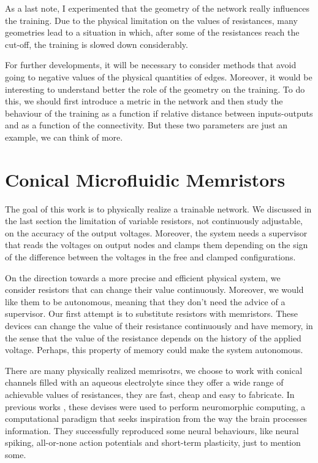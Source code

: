 \documentclass[10.5pt]{article}
\begin{document}
As a last note, I experimented that the geometry of the network really influences the training. Due to the physical limitation on the values of resistances, many geometries lead to a situation in which, after some of the resistances reach the cut-off, the training is slowed down considerably. 

For further developments, it will be necessary to consider methods that avoid going to negative values of the physical quantities of edges. Moreover, it would be interesting to understand better the role of the geometry on the training. To do this, we should first introduce a metric in the network and then study the behaviour of the training as a function if relative distance between inputs-outputs and as a function of the connectivity. But these two parameters are just an example, we can think of more.

\clearpage
\section{Conical Microfluidic Memristors}

The goal of this work is to physically realize a trainable network. We discussed in the last section the limitation of variable resistors, not continuously adjustable, on the accuracy of the output voltages. Moreover, the system needs a supervisor that reads the voltages on output nodes and clamps them depending on the sign of the difference between the voltages in the free and clamped configurations.

On the direction towards a more precise and efficient physical system, we consider resistors that can change their value continuously. Moreover, we would like them to be autonomous, meaning that they don't need the advice of a supervisor. Our first attempt is to substitute resistors with memristors. These devices can change the value of their resistance continuously and have memory, in the sense that the value of the resistance depends on the history of the applied voltage. Perhaps, this property of memory could make the system autonomous.

There are many physically realized memrisotrs, we choose to work with conical channels filled with an aqueous electrolyte since they offer a wide range of achievable values of resistances, they are fast, cheap and easy to fabricate. In previous works \cite{cone1, cone2}, these devises were used to perform neuromorphic computing, a computational paradigm that seeks inspiration from the way the brain processes information. They successfully reproduced some neural behaviours, like neural spiking, all-or-none action potentials and short-term plasticity, just to mention some.
\end{document}
